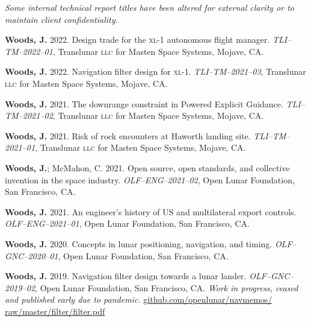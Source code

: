 \documentclass[12pt,letterpaper]{article}
\newcommand{\mhead}[1]{\leavevmode\marginpar{\sffamily\footnotesize #1}}
\begin{document}
\bigskip
\mhead{Technical \newline Reports}%
\par\vspace{-\baselineskip}\textit{Some internal technical report titles have been altered for external clarity or to maintain client confidentiality.}

\medskip
\par\textbf{Woods, J.} 2022. Design trade for the \textsc{xl}-1 autonomous flight manager. \textit{TLI--TM--2022--01}, Translunar \textsc{llc} for Masten Space Systems, Mojave, CA.

\medskip
\par\textbf{Woods, J.} 2022. Navigation filter design for \textsc{xl}-1. \textit{TLI--TM--2021--03}, Translunar \textsc{llc} for Masten Space Systems, Mojave, CA.

\medskip
\par\textbf{Woods, J.} 2021. The downrange constraint in Powered Explicit Guidance. \textit{TLI--TM--2021--02}, Translunar \textsc{llc} for Masten Space Systems, Mojave, CA.

\medskip
\par\textbf{Woods, J.} 2021. Risk of rock encounters at Haworth landing site. \textit{TLI--TM--2021--01}, Translunar \textsc{llc} for Masten Space Systems, Mojave, CA.

\medskip
\par\textbf{Woods, J.}; McMahon, C. 2021. Open source, open standards, and collective invention in the space industry. \textit{OLF--ENG--2021--02}, Open Lunar Foundation, San Francisco, CA.

\medskip
\par\textbf{Woods, J.} 2021. An engineer's history of US and multilateral export controls. \textit{OLF--ENG--2021--01}, Open Lunar Foundation, San Francisco, CA.

\medskip
\par\textbf{Woods, J.} 2020. Concepts in lunar positioning, navigation, and timing. \textit{OLF--GNC--2020--01}, Open Lunar Foundation, San Francisco, CA.

\medskip
\par\textbf{Woods, J.} 2019. Navigation filter design towards a lunar lander. \textit{OLF--GNC--2019--02}, Open Lunar Foundation, San Francisco, CA. \textit{Work in progress, ceased and published early due to pandemic.} \href{https://github.com/openlunar/navmemos/raw/master/filter/filter.pdf}{github.com/openlunar/navmemos/ raw/master/filter/filter.pdf}
\end{document}
